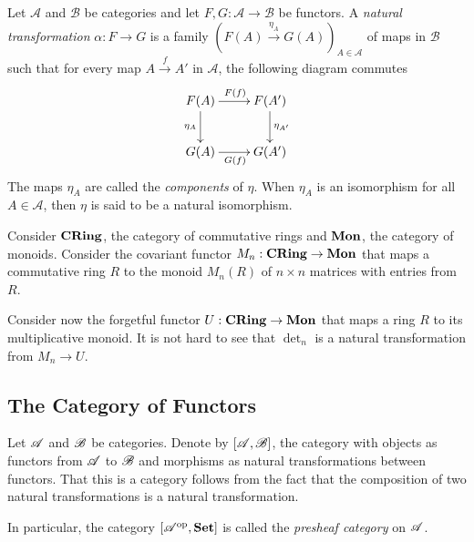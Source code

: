\begin{definition}
    Let $\mathscr A$ and $\mathscr B$ be categories and let $F, G:\mathscr A\longrightarrow\mathscr B$ be functors. A \textit{natural transformation} $\alpha: F\to G$ is a family $\left(F(A)\stackrel{\eta_A}{\longrightarrow}G(A)\right)_{A\in\mathscr A}$ of maps in $\mathscr B$ such that for every map $A\stackrel{f}{\longrightarrow}A'$ in $\mathscr A$, the following diagram commutes
    \begin{equation*}
        \xymatrix{
            F(A)\ar[r]^{F(f)}\ar[d]_{\eta_A} & F(A')\ar[d]^{\eta_{A'}}\\
            G(A)\ar[r]_{G(f)} & G(A')
        }
    \end{equation*}
    The maps $\eta_A$ are called the \textit{components} of $\eta$. When $\eta_A$ is an isomorphism for all $A\in\mathscr A$, then $\eta$ is said to be a natural isomorphism.
\end{definition}

Consider $\mathbf{CRing}$, the category of commutative rings and $\mathbf{Mon}$, the category of monoids. Consider the covariant functor $M_n:\mathbf{CRing}\to\mathbf{Mon}$ that maps a commutative ring $R$ to the monoid $M_n(R)$ of $n\times n$ matrices with entries from $R$. 

Consider now the forgetful functor $U:\mathbf{CRing}\to\mathbf{Mon}$ that maps a ring $R$ to its multiplicative monoid. It is not hard to see that $\det_n$ is a natural transformation from $M_n\to U$.

\subsection{The Category of Functors}

Let $\mathscr{A}$ and $\mathscr{B}$ be categories. Denote by $[\mathscr{A},\mathscr{B}]$, the category with objects as functors from $\mathscr{A}$ to $\mathscr{B}$ and morphisms as natural transformations between functors. That this is a category follows from the fact that the composition of two natural transformations is a natural transformation.

In particular, the category $[\mathscr{A}^{\text{op}},\mathbf{Set}]$ is called the \textit{presheaf category} on $\mathscr{A}$.